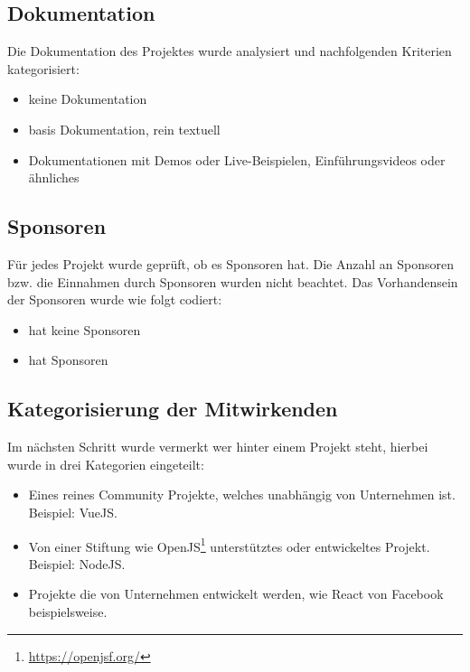 \subsection{Dokumentation} \label{ssec:manuelle_datenerfassung_dokumentation}
Die Dokumentation des Projektes wurde analysiert und nachfolgenden Kriterien kategorisiert:

\begin{itemize}[noitemsep]
    \item[0 =] keine Dokumentation
    \item[1 =] basis Dokumentation, rein textuell
    \item[2 =] Dokumentationen mit Demos oder Live-Beispielen,
        Einführungsvideos oder ähnliches
\end{itemize}


\subsection{Sponsoren}
Für jedes Projekt wurde geprüft, ob es Sponsoren hat. Die Anzahl an Sponsoren bzw. die Einnahmen
durch Sponsoren wurden nicht beachtet. Das Vorhandensein der Sponsoren wurde wie folgt codiert:

\begin{itemize}[noitemsep]
    \item[0 =] hat keine Sponsoren
    \item[1 =] hat Sponsoren
\end{itemize}


\subsection{Kategorisierung der Mitwirkenden} %


Im nächsten Schritt wurde vermerkt wer hinter einem Projekt steht, hierbei wurde in drei Kategorien
eingeteilt:

\begin{itemize}[noitemsep]
    \item[0 =] Eines reines Community Projekte, welches unabhängig von Unternehmen ist. Beispiel: VueJS.
    \item[1 =] Von einer Stiftung wie OpenJS\footnote{\url{https://openjsf.org/}} unterstütztes oder
        entwickeltes Projekt.\\ Beispiel: NodeJS.
    \item[2 =] Projekte die von Unternehmen entwickelt werden, wie React von Facebook beispielsweise.
\end{itemize}

